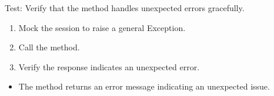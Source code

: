 \documentclass[letterpaper,10pt,english]{sphinxmanual}
\begin{document}
\begin{fulllineitems}
\label{\detokenize{test:test.test_admin.test_update_admin_name_unexpected_error}}
\pysigstartsignatures
\pysiglinewithargsret
{}
{\sphinxparamcomma {}}
{}
\pysigstopsignatures
\sphinxAtStartPar
Test: Verify that the method handles unexpected errors gracefully.
\begin{description}
\begin{enumerate}
%
\item {} 
\sphinxAtStartPar
Mock the session to raise a general Exception.

\item {} 
\sphinxAtStartPar
Call the  method.

\item {} 
\sphinxAtStartPar
Verify the response indicates an unexpected error.

\end{enumerate}

\begin{itemize}
\item {} 
\sphinxAtStartPar
The method returns an error message indicating an unexpected issue.

\end{itemize}

\end{description}

\end{fulllineitems}

\end{document}

